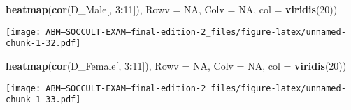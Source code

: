 \documentclass[]{article}
\newenvironment{Shaded}{\begin{snugshade}}{\end{snugshade}}
\newcommand{\KeywordTok}[1]{\textcolor[rgb]{0.13,0.29,0.53}{\textbf{#1}}}
\newcommand{\DataTypeTok}[1]{\textcolor[rgb]{0.13,0.29,0.53}{#1}}
\newcommand{\DecValTok}[1]{\textcolor[rgb]{0.00,0.00,0.81}{#1}}
\newcommand{\StringTok}[1]{\textcolor[rgb]{0.31,0.60,0.02}{#1}}
\newcommand{\CommentTok}[1]{\textcolor[rgb]{0.56,0.35,0.01}{\textit{#1}}}
\newcommand{\OtherTok}[1]{\textcolor[rgb]{0.56,0.35,0.01}{#1}}
\newcommand{\OperatorTok}[1]{\textcolor[rgb]{0.81,0.36,0.00}{\textbf{#1}}}
\newcommand{\AlertTok}[1]{\textcolor[rgb]{0.94,0.16,0.16}{#1}}
\newcommand{\NormalTok}[1]{#1}
\begin{document}
\begin{Shaded}
\begin{Highlighting}[]
\KeywordTok{heatmap}\NormalTok{(}\KeywordTok{cor}\NormalTok{(D_Male[, }\DecValTok{3}\OperatorTok{:}\DecValTok{11}\NormalTok{]), }\DataTypeTok{Rowv =} \OtherTok{NA}\NormalTok{, }\DataTypeTok{Colv =} \OtherTok{NA}\NormalTok{, }\DataTypeTok{col =} \KeywordTok{viridis}\NormalTok{(}\DecValTok{20}\NormalTok{))}
\end{Highlighting}
\end{Shaded}

\texttt{[image: ABM---SOCCULT-EXAM---final-edition-2\_files/figure-latex/unnamed-chunk-1-32.pdf]}

\begin{Shaded}
\begin{Highlighting}[]
\KeywordTok{heatmap}\NormalTok{(}\KeywordTok{cor}\NormalTok{(D_Female[, }\DecValTok{3}\OperatorTok{:}\DecValTok{11}\NormalTok{]), }\DataTypeTok{Rowv =} \OtherTok{NA}\NormalTok{, }\DataTypeTok{Colv =} \OtherTok{NA}\NormalTok{, }\DataTypeTok{col =} \KeywordTok{viridis}\NormalTok{(}\DecValTok{20}\NormalTok{))}
\end{Highlighting}
\end{Shaded}

\texttt{[image: ABM---SOCCULT-EXAM---final-edition-2\_files/figure-latex/unnamed-chunk-1-33.pdf]}

\begin{Shaded}
\end{Shaded}
\end{document}

